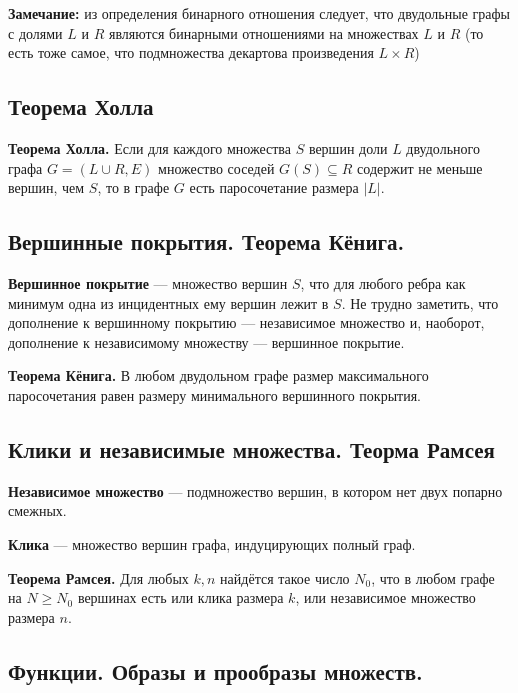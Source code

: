\documentclass[a4paper, 10pt]{article}
\begin{document}
\textbf{Замечание:} из определения бинарного отношения следует, что двудольные графы с долями $L$ и $R$ являются бинарными отношениями на множествах $L$ и $R$ (то есть тоже самое, что подмножества декартова произведения $L \times R$)



\subsection{Теорема Холла}

\textbf{Теорема Холла.} Если для каждого множества $S$ вершин доли $L$ двудольного графа $G=(L \cup R, E)$ множество соседей $G(S) \subseteq R$ содержит не меньше вершин, чем $S$, то в графе $G$ есть паросочетание размера $|L|$.


\subsection{Вершинные покрытия. Теорема Кёнига.}


\textbf{Вершинное покрытие} --- множество вершин $S$, что для любого ребра как минимум одна из инцидентных ему вершин лежит в $S$. Не трудно заметить, что дополнение к вершинному покрытию --- независимое множество и, наоборот, дополнение к независимому множеству --- вершинное покрытие.

\vspace{2mm}

\textbf{Теорема Кёнига.} В любом двудольном графе размер максимального паросочетания равен размеру минимального вершинного покрытия.


\subsection{Клики и независимые множества. Теорма Рамсея}


\textbf{Независимое множество} --- подмножество вершин, в котором нет двух попарно смежных.


\textbf{Клика} --- множество вершин графа, индуцирующих полный граф.


\textbf{Теорема Рамсея.} Для любых $k, n$ найдётся такое число $N_0$, что в любом графе на $N \geqslant N_0$ вершинах есть или клика размера $k$, или независимое множество размера $n$.


\subsection{Функции. Образы и прообразы множеств.}
\end{document}
